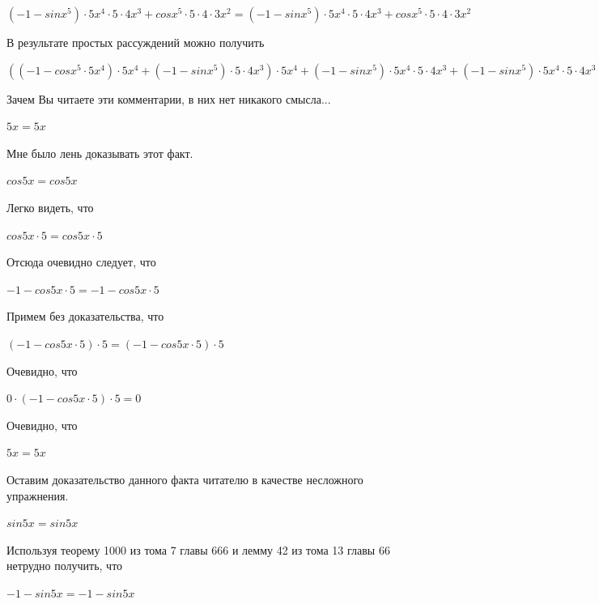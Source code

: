 \documentclass[12pt,a4paper,fleqn]{article}
\theoremstyle{definition}
\begin{document}
$( -1  - sin{ x }^{ 5 }) \cdot  5 { x }^{ 4 } \cdot  5  \cdot  4 { x }^{ 3 } + cos{ x }^{ 5 } \cdot  5  \cdot  4  \cdot  3 { x }^{ 2 } = ( -1  - sin{ x }^{ 5 }) \cdot  5 { x }^{ 4 } \cdot  5  \cdot  4 { x }^{ 3 } + cos{ x }^{ 5 } \cdot  5  \cdot  4  \cdot  3 { x }^{ 2 }$

В результате простых рассуждений можно получить 

$(( -1  - cos{ x }^{ 5 } \cdot  5 { x }^{ 4 }) \cdot  5 { x }^{ 4 } + ( -1  - sin{ x }^{ 5 }) \cdot  5  \cdot  4 { x }^{ 3 }) \cdot  5 { x }^{ 4 } + ( -1  - sin{ x }^{ 5 }) \cdot  5 { x }^{ 4 } \cdot  5  \cdot  4 { x }^{ 3 } + ( -1  - sin{ x }^{ 5 }) \cdot  5 { x }^{ 4 } \cdot  5  \cdot  4 { x }^{ 3 } + cos{ x }^{ 5 } \cdot  5  \cdot  4  \cdot  3 { x }^{ 2 } = (( -1  - cos{ x }^{ 5 } \cdot  5 { x }^{ 4 }) \cdot  5 { x }^{ 4 } + ( -1  - sin{ x }^{ 5 }) \cdot  5  \cdot  4 { x }^{ 3 }) \cdot  5 { x }^{ 4 } + ( -1  - sin{ x }^{ 5 }) \cdot  5 { x }^{ 4 } \cdot  5  \cdot  4 { x }^{ 3 } + ( -1  - sin{ x }^{ 5 }) \cdot  5 { x }^{ 4 } \cdot  5  \cdot  4 { x }^{ 3 } + cos{ x }^{ 5 } \cdot  5  \cdot  4  \cdot  3 { x }^{ 2 }$

Зачем Вы читаете эти комментарии, в них нет никакого смысла... 

$ 5  x  =  5  x $

Мне было лень доказывать этот факт.

$cos 5  x  = cos 5  x $

Легко видеть, что 

$cos 5  x  \cdot  5  = cos 5  x  \cdot  5 $

Отсюда очевидно следует, что 

$ -1  - cos 5  x  \cdot  5  =  -1  - cos 5  x  \cdot  5 $

Примем без доказательства, что 

$( -1  - cos 5  x  \cdot  5 ) \cdot  5  = ( -1  - cos 5  x  \cdot  5 ) \cdot  5 $

Очевидно, что 

$ 0  \cdot ( -1  - cos 5  x  \cdot  5 ) \cdot  5  =  0 $

Очевидно, что 

$ 5  x  =  5  x $

Оставим доказательство данного факта читателю в качестве несложного упражнения. 

$sin 5  x  = sin 5  x $

Используя теорему 1000 из тома 7 главы 666 и лемму 42 из тома 13 главы 66 нетрудно получить, что 

$ -1  - sin 5  x  =  -1  - sin 5  x $
\end{document}
